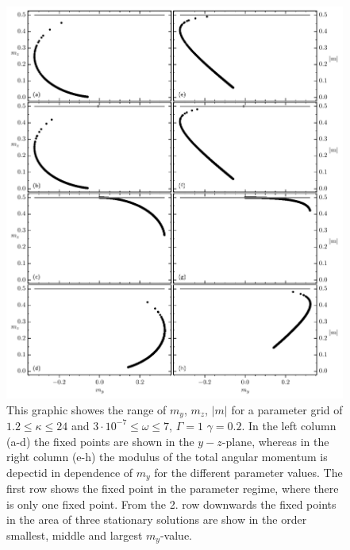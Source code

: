 \documentclass{article}
\begin{document}
\begin{figure}[H]
    \hspace*{-1cm}
    \includegraphics{pictures/fixp_boundaries.pdf}
    \caption{This graphic showes the range of $m_y$, $m_z$, $|m|$ for a parameter grid of $1.2\leq\kappa\leq24$ and $3\cdot10^{-7}\leq\omega\leq7$, $\Gamma=1$ $\gamma=0.2$. In the left column (a-d) the fixed points are shown in the $y-z$-plane, whereas in the right column (e-h) the modulus of the total angular momentum is depectid in dependence of $m_y$ for the different parameter values. The first row shows the fixed point in the parameter regime, where there is only one fixed point. From the 2. row downwards the fixed points in the area of three stationary solutions are show in the order smallest, middle and largest $m_y$-value.}
\end{figure}
\end{document}
